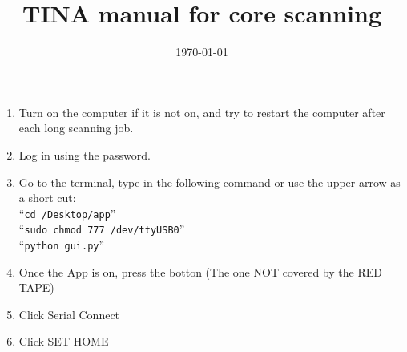 \documentclass[11pt,letter]{article}
\begin{document}
\title{TINA manual for core scanning} 
\date{\today}
\maketitle

\setlength{\parindent}{0pt}
\setlength{\parskip}{3pt}
\begin{enumerate}
\item Turn on the computer if it is not on, and try to restart the computer after each long scanning job.
\item Log in using the password.
\item Go to the terminal, type in the following command or use the upper arrow as a short cut:\\
``\texttt{cd /Desktop/app}''\\
``\texttt{sudo chmod 777 /dev/ttyUSB0}''\\
``\texttt{python gui.py}''
\item Once the App is on, press the botton (The one NOT covered by the RED TAPE)
\item Click Serial Connect
\item Click SET HOME
	\end{enumerate}
\end{document}
